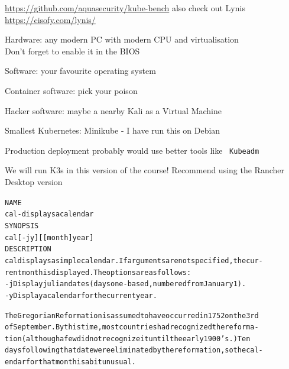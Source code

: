 \documentclass[Screen16to9,17pt]{foils}
\begin{document}
\begin{list2}
\item \url{https://github.com/aquasecurity/kube-bench} also check out Lynis \url{https://cisofy.com/lynis/}
\end{list2}






\begin{list2}
\item Hardware: any modern PC with modern CPU and virtualisation\\
Don't forget to enable it in the BIOS
\item Software: your favourite operating system
\item Container software: pick your poison
\item Hacker software: maybe a nearby Kali as a Virtual Machine 
\item Smallest Kubernetes: Minikube -  I have run this on Debian
\item Production deployment probably would use better tools like \faWrench\ \verb+Kubeadm+
\end{list2}

We will run K3s in this version of the course! Recommend using the Rancher Desktop version






\begin{alltt}\footnotesize
\small
NAME
     cal - displays a calendar
SYNOPSIS
     cal [-jy] [[month]  year]
DESCRIPTION
   cal displays a simple calendar.  If arguments are not specified, the cur-
   rent month is displayed.  The options are as follows:
   -j      Display julian dates (days one-based, numbered from January 1).
   -y      Display a calendar for the current year.

The Gregorian Reformation is assumed to have occurred in 1752 on the 3rd
of September.  By this time, most countries had recognized the reforma-
tion (although a few did not recognize it until the early 1900's.)  Ten
days following that date were eliminated by the reformation, so the cal-
endar for that month is a bit unusual.
\end{alltt}

\end{document}
